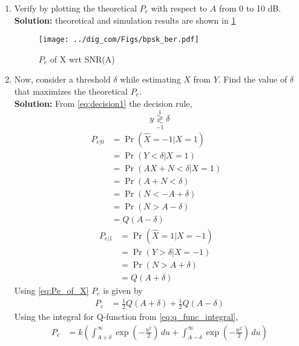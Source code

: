 \documentclass{article}
\numberwithin{equation}{subsection}
\numberwithin{figure}{subsection}
\providecommand{\pr}[1]{\ensuremath{\Pr\left(#1\right)}}
\providecommand{\dec}[2]{\ensuremath{\overset{#1}{\underset{#2}{\gtrless}}}}
\newcommand{\solution}{\noindent \textbf{Solution: }}
\renewcommand\thesection{\arabic{section}}
\renewcommand\thesubsection{\thesection.\arabic{subsection}}
\begin{document}
\begin{enumerate}[label=\thesubsection.\arabic*,ref=\thesubsection.\arabic{figure}]
\item
Verify by plotting  the theoretical $P_e$ with respect to $A$ from 0 to 10 dB.\\
\solution 
theoretical and simulation results are shown in \ref{fig:bpsk1}
\begin{center}
\end{center}
\begin{figure}
\centering
\texttt{[image: ../dig\_com/Figs/bpsk\_ber.pdf]}   
\caption{$P_e$ of X wrt SNR(A)}
\label{fig:bpsk1}
\end{figure}
\item Now, consider a threshold $\delta$  while estimating $X$ from $Y$. Find the value of $\delta$ that maximizes the theoretical $P_e$.\\
\solution From \ref{eq:decision1} the decision rule, 
\begin{equation}
y \dec{1}{-1} \delta
\end{equation}
\begin{align*}
	P_{e|0} &= \pr{\hat{X} = -1|X=1}&\\
	&= \pr{Y < \delta|X=1}&\\
	&= \pr{AX + N < \delta|X=1}&\\ 
	&= \pr{A + N < \delta}&\\
	&= \pr{N < -A + \delta}&\\
	&= \pr{N > A - \delta}&\\
	&= Q(A-\delta)
\end{align*}
\begin{align*}
	P_{e|1} &= \pr{\hat{X} = 1|X=-1}&\\
	&= \pr{Y > \delta|X=-1}&\\
	&= \pr{N > A + \delta}&\\
	&= Q(A+\delta)
\end{align*}
Using \ref{eq:Pe_of_X} $P_e$ is given by
\begin{align}
	P_e &= \frac{1}{2}Q(A+\delta) + \frac{1}{2}Q(A-\delta)
\end{align}
Using the integral for Q-function from \ref{eq:q_func_integral},
\begin{align}
	P_e &= k(\int_{A+\delta}^\infty \exp\left(-\frac{u^2}{2}\right) \, du + \int_{A-\delta}^\infty \exp\left(-\frac{u^2}{2}\right) \, du)
	\label{eq:Pe_in_q}
	\end{align}
		\\

\end{enumerate}
\end{document}

